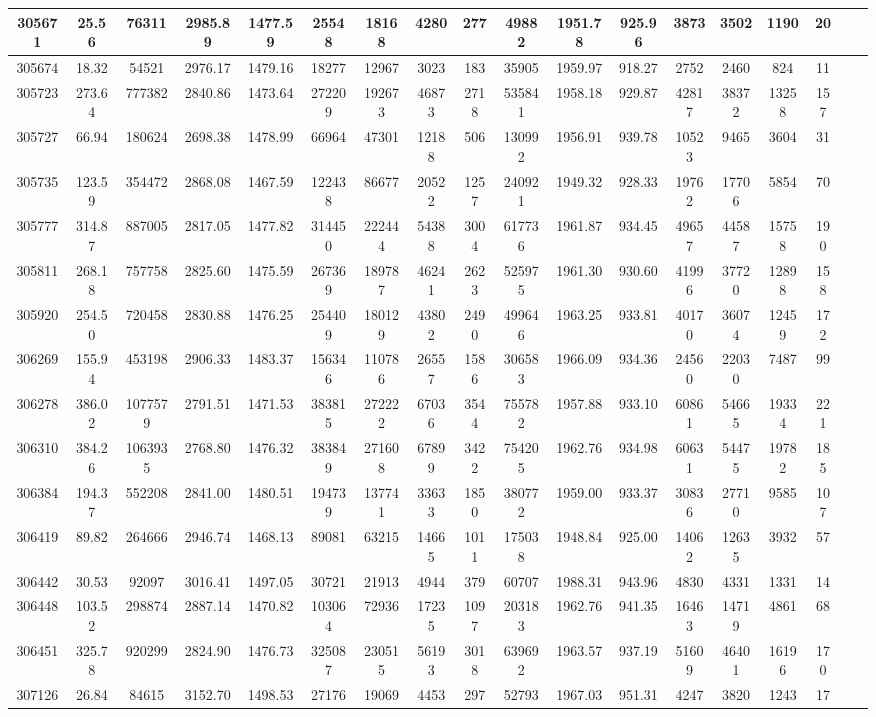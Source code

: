 \documentclass[10pt]{extarticle}
\begin{document}
\begin{longtable}{|c|c|c|c|c|c|c|c|c|c|c|c|c|c|c|c|c|c|}
\hline 
305671&25.56&76311&2985.89&1477.59&25548&18168&4280&277&49882&1951.78&925.96&3873&3502&1190&20 \\ 
\hline 
305674&18.32&54521&2976.17&1479.16&18277&12967&3023&183&35905&1959.97&918.27&2752&2460&824&11 \\ 
\hline 
305723&273.64&777382&2840.86&1473.64&272209&192673&46873&2718&535841&1958.18&929.87&42817&38372&13258&157 \\ 
\hline 
305727&66.94&180624&2698.38&1478.99&66964&47301&12188&506&130992&1956.91&939.78&10523&9465&3604&31 \\ 
\hline 
305735&123.59&354472&2868.08&1467.59&122438&86677&20522&1257&240921&1949.32&928.33&19762&17706&5854&70 \\ 
\hline 
305777&314.87&887005&2817.05&1477.82&314450&222444&54388&3004&617736&1961.87&934.45&49657&44587&15758&190 \\ 
\hline 
305811&268.18&757758&2825.60&1475.59&267369&189787&46241&2623&525975&1961.30&930.60&41996&37720&12898&158 \\ 
\hline 
305920&254.50&720458&2830.88&1476.25&254409&180129&43802&2490&499646&1963.25&933.81&40170&36074&12459&172 \\ 
\hline 
306269&155.94&453198&2906.33&1483.37&156346&110786&26557&1586&306583&1966.09&934.36&24560&22030&7487&99 \\ 
\hline 
306278&386.02&1077579&2791.51&1471.53&383815&272222&67036&3544&755782&1957.88&933.10&60861&54665&19334&221 \\ 
\hline 
306310&384.26&1063935&2768.80&1476.32&383849&271608&67899&3422&754205&1962.76&934.98&60631&54475&19782&185 \\ 
\hline 
306384&194.37&552208&2841.00&1480.51&194739&137741&33633&1850&380772&1959.00&933.37&30836&27710&9585&107 \\ 
\hline 
306419&89.82&264666&2946.74&1468.13&89081&63215&14665&1011&175038&1948.84&925.00&14062&12635&3932&57 \\ 
\hline 
306442&30.53&92097&3016.41&1497.05&30721&21913&4944&379&60707&1988.31&943.96&4830&4331&1331&14 \\ 
\hline 
306448&103.52&298874&2887.14&1470.82&103064&72936&17235&1097&203183&1962.76&941.35&16463&14719&4861&68 \\ 
\hline 
306451&325.78&920299&2824.90&1476.73&325087&230515&56193&3018&639692&1963.57&937.19&51609&46401&16196&170 \\ 
\hline 
307126&26.84&84615&3152.70&1498.53&27176&19069&4453&297&52793&1967.03&951.31&4247&3820&1243&17 \\ 

\end{longtable}
\end{document}
